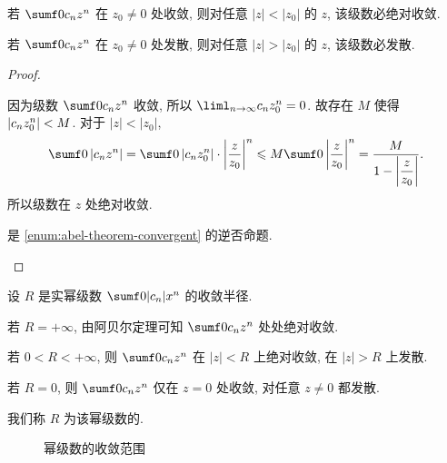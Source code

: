 \begin{theorem}[阿贝尔定理]
  \begin{enumpar}
    \item 若 $\sumf0 c_nz^n$ 在 $z_0\neq 0$ 处收敛, 则对任意 $|z|<|z_0|$ 的 $z$, 该级数必绝对收敛.\label{enum:abel-theorem-convergent}
    \item 若 $\sumf0 c_nz^n$ 在 $z_0\neq 0$ 处发散, 则对任意 $|z|>|z_0|$ 的 $z$, 该级数必发散.
  \end{enumpar}
\end{theorem}

\begin{proof}
  \begin{enumnopar}
    \item 因为级数 $\sumf0 c_nz^n$ 收敛, 所以 $\liml_{n\ra\infty}c_n z_0^n=0$.
      故存在 $M$ 使得 $\left|c_nz_0^n\right|<M$.
      对于 $|z|<|z_0|$,
      \[
         \sumf0 \abs{c_nz^n}
        =\sumf0 \abs{c_nz_0^n}\cdot\abs{\frac z{z_0}}^n
        \le M\sumf0 \abs{\frac z{z_0}}^n
        =\frac{M}{1-\abs{\dfrac z{z_0}}}.
      \]
      所以级数在 $z$ 处绝对收敛.
    \item 是 \ref{enum:abel-theorem-convergent} 的逆否命题.\qedhere
  \end{enumnopar}
\end{proof}

设 $R$ 是实幂级数 $\sumf0 |c_n|x^n$ 的收敛半径.
\begin{enumpar}
  \item 若 $R=+\infty$, 由阿贝尔定理可知 $\sumf0 c_nz^n$ 处处绝对收敛.
  \item 若 $0<R<+\infty$, 则 $\sumf0 c_nz^n$ 在 $|z|<R$ 上绝对收敛, 在 $|z|>R$ 上发散.
  \item 若 $R=0$, 则 $\sumf0 c_nz^n$ 仅在 $z=0$ 处收敛, 对任意 $z\neq 0$ 都发散.
\end{enumpar}\parnoindent
我们称 $R$ 为该幂级数的.

\begin{figure}[!hbt]
  \centering
  \caption{幂级数的收敛范围}
\end{figure}

